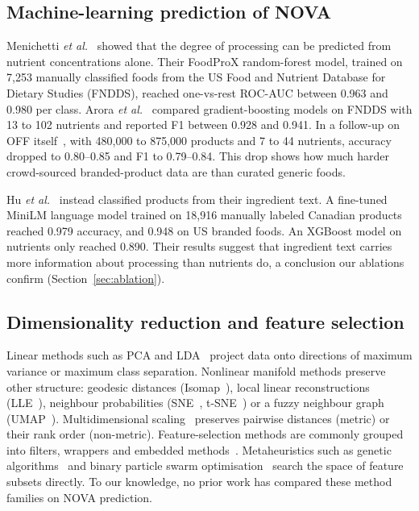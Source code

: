 \documentclass[conference]{IEEEtran}
\begin{document}
\subsection{Machine-learning prediction of NOVA}
Menichetti \emph{et al.}~\cite{menichetti2023foodprox} showed that the degree of processing can be predicted from nutrient concentrations alone. Their FoodProX random-forest model, trained on 7,253 manually classified foods from the US Food and Nutrient Database for Dietary Studies (FNDDS), reached one-vs-rest ROC-AUC between 0.963 and 0.980 per class. Arora \emph{et al.}~\cite{arora2025fndds} compared gradient-boosting models on FNDDS with 13 to 102 nutrients and reported F1 between 0.928 and 0.941. In a follow-up on OFF itself~\cite{arora2025off}, with 480,000 to 875,000 products and 7 to 44 nutrients, accuracy dropped to 0.80--0.85 and F1 to 0.79--0.84. This drop shows how much harder crowd-sourced branded-product data are than curated generic foods.

Hu \emph{et al.}~\cite{hu2023nutrients} instead classified products from their ingredient text. A fine-tuned MiniLM language model trained on 18,916 manually labeled Canadian products reached 0.979 accuracy, and 0.948 on US branded foods. An XGBoost model on nutrients only reached 0.890. Their results suggest that ingredient text carries more information about processing than nutrients do, a conclusion our ablations confirm (Section~\ref{sec:ablation}).

\subsection{Dimensionality reduction and feature selection}
Linear methods such as PCA and LDA~\cite{bishop2006} project data onto directions of maximum variance or maximum class separation. Nonlinear manifold methods preserve other structure: geodesic distances (Isomap~\cite{tenenbaum2000isomap}), local linear reconstructions (LLE~\cite{roweis2000lle}), neighbour probabilities (SNE~\cite{hinton2002sne}, t-SNE~\cite{vandermaaten2008tsne}) or a fuzzy neighbour graph (UMAP~\cite{mcinnes2018umap}). Multidimensional scaling~\cite{borg2005mds} preserves pairwise distances (metric) or their rank order (non-metric). Feature-selection methods are commonly grouped into filters, wrappers and embedded methods~\cite{guyon2003}. Metaheuristics such as genetic algorithms~\cite{holland1975} and binary particle swarm optimisation~\cite{kennedy1997bpso} search the space of feature subsets directly. To our knowledge, no prior work has compared these method families on NOVA prediction.
\end{document}
